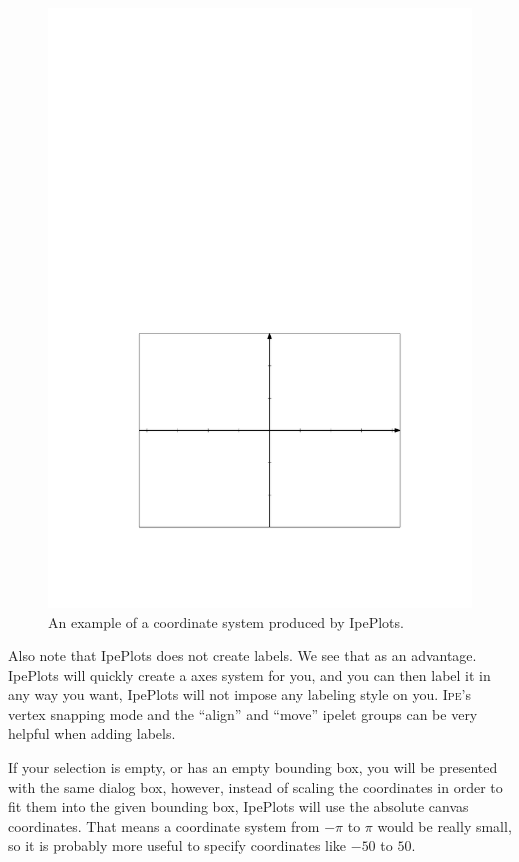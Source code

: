 \documentclass{article}
\def\Ipe{\textsc{Ipe}}
\begin{document}
\begin{figure}[h]
   \begin{center}
      \includegraphics[scale=.7]{coord_sys}
   \end{center}
   \caption{An example of a coordinate system produced by IpePlots.}
   \label{fig:coord_sys}
\end{figure}

Also note that IpePlots does not create labels.  We see that as an advantage.
IpePlots will quickly create a axes system for you, and you can then label it
in any way you want, IpePlots will not impose any labeling style on you. \Ipe's
vertex snapping mode  and the ``align'' and ``move'' ipelet groups can be very
helpful when adding labels. 

If your selection is empty, or has an empty bounding box, you will be presented
with the same dialog box, however, instead of scaling the coordinates in order
to fit them into the given bounding box, IpePlots will use the absolute canvas
coordinates.  That means a coordinate system from $-\pi$ to $\pi$ would be
really small, so it is probably more useful to specify coordinates like $-50$
to $50$. 
\end{document}
